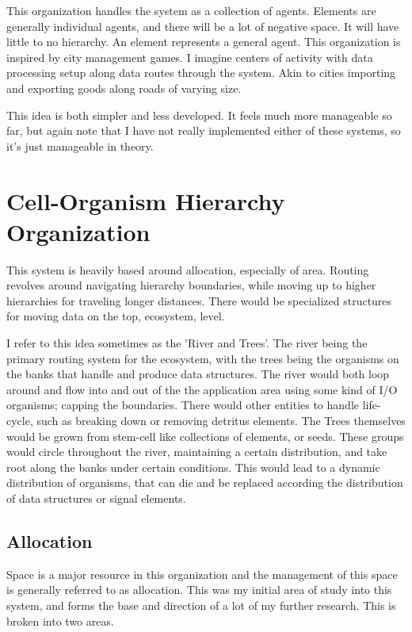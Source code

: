 \documentclass[article,12pt,oneside]{memoir}
\begin{document}
This organization handles the system as a collection of agents.
Elements are generally individual agents, and there will be a lot of negative space.
It will have little to no hierarchy.
An element represents a general agent.
This organization is inspired by city management games.
I imagine centers of activity with data processing setup along data routes through the system.
Akin to cities importing and exporting goods along roads of varying size.

This idea is both simpler and less developed.
It feels much more manageable so far, but again note that I have not really implemented either of these systems, so it's just manageable in theory.


\pagebreak
\chapter{Cell-Organism Hierarchy Organization}

This system is heavily based around allocation, especially of area.
Routing revolves around navigating hierarchy boundaries, while moving up to higher hierarchies for traveling longer distances.
There would be specialized structures for moving data on the top, ecosystem, level.

I refer to this idea sometimes as the 'River and Trees'.
The river being the primary routing system for the ecosystem, with the trees being the organisms on the banks that handle and produce data structures.
The river would both loop around and flow into and out of the the application area using some kind of I/O organisms; capping the boundaries.
There would other entities to handle life-cycle, such as breaking down or removing detritus elements.
The Trees themselves would be grown from stem-cell like collections of elements, or seeds.
These groups would circle throughout the river, maintaining a certain distribution, and take root along the banks under certain conditions.
This would lead to a dynamic distribution of organisms, that can die and be replaced according the distribution of data structures or signal elements.


\section{Allocation}

Space is a major resource in this organization and the management of this space is generally referred to as allocation.
This was my initial area of study into this system, and forms the base and direction of a lot of my further research.
This is broken into two areas.
\end{document}

